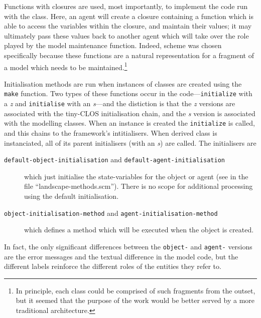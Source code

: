 Functions with closures are used, most importantly, to implement the
code run with the  class. Here, an agent will
create a closure containing a function which is able to access the
variables within the closure, and maintain their values; it may
ultimately pass these values back to another agent which will take
over the role played by the model maintenance function.  Indeed,
scheme was chosen specifically because these functions are a natural
representation for a fragment of a model which needs to be
maintained.\footnote{In principle, each class could be comprised of such
fragments from the outset, but it seemed that the purpose of the
work would be better served by a more traditional architecture.}

Initialisation methods are run when instances of classes are created
using the \texttt{make} function.  Two types of these functions occur
in the code---\texttt{initialize} with a \emph{z} and
\texttt{initialise} with an \emph{s}---and the distiction is that
the \emph{z} versions are associated with the tiny-CLOS initialisation
chain, and the \emph{s} version is associated with the modelling
classes. When an instance is created the 
\texttt{initialize} is called, and this chains to the framework's
intitialisers.  When  derived class is instanciated, all of
its parent initialisers (with an \emph{s}) are called.  The
initialisers are
\begin{description}
  \item[\texttt{default-object-initialisation} and
    \texttt{default-agent-initialisation}] which just initialise the
    state-variables for the object or agent (see  in the
    file ``landscape-methods.scm''). There is no scope for additional
    processing using the default initialisation.
  \item[\texttt{object-initialisation-method} and
    \texttt{agent-initialisation-method}] which defines a method which
    will be executed when the object is created.
\end{description}
In fact, the only significant differences between the \texttt{object-}
and \texttt{agent-} versions are the error messages and the textual
difference in the model code, but the different labels reinforce the
different roles of the entities they refer to.
    
